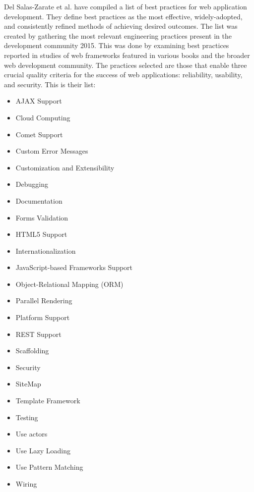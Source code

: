 Del Salas-Zarate et al. have compiled a list of best practices for web application development. They define best practices as the most effective, widely-adopted, and consistently refined methods of achieving desired outcomes. The list was created by gathering the most relevant engineering practices present in the development community 2015. This was done by examining best practices reported in studies of web frameworks featured in various books and the broader web development community. The practices selected are those that enable three crucial quality criteria for the success of web applications: reliability, usability, and security. This is their list:
\begin{itemize}
  \item AJAX Support
  \item Cloud Computing
  \item Comet Support
  \item Custom Error Messages
  \item Customization and Extensibility
  \item Debugging
  \item Documentation
  \item Forms Validation
  \item HTML5 Support
  \item Internationalization
  \item JavaScript-based Frameworks Support
  \item Object-Relational Mapping (ORM)
  \item Parallel Rendering
  \item Platform Support
  \item REST Support
  \item Scaffolding
  \item Security
  \item SiteMap
  \item Template Framework
  \item Testing
  \item Use actors
  \item Use Lazy Loading
  \item Use Pattern Matching
  \item Wiring
\end{itemize}

